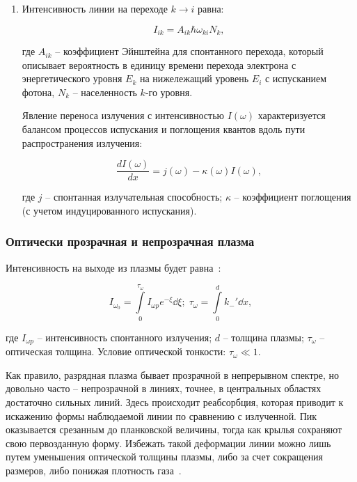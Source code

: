 \documentclass[10pt, a4paper]{article}
\begin{document}
\begin{enumerate}
	\item Интенсивность линии на переходе
$k\rightarrow i$ равна:

	\begin{equation*}
		I_{ik} = A_{ik}\hbar\omega_{ki}N_k,
	\end{equation*}	
	
	где $A_{ik}$ -- коэффициент Эйнштейна для спонтанного перехода,
	который описывает вероятность в единицу времени перехода
	электрона с энергетического уровня $E_k$ на нижележащий 
	уровень $E_i$ с испусканием фотона, $N_k$ -- населенность $k$-го уровня.
		
	Явление переноса излучения с интенсивностью $I(\omega)$ характеризуется балансом процессов испускания и поглощения
	квантов вдоль пути распространения излучения:
	
	\begin{equation}
		\frac{dI(\omega)}{dx}=j(\omega)-\kappa(\omega)I(\omega),
	\end{equation}

	где $j$ -- спонтанная излучательная способность; $\kappa$ -- коэффициент поглощения (с учетом индуцированного испускания).
	
\end{enumerate}

\subsubsection{Оптически прозрачная и непрозрачная плазма} \label{subsubsec:optical_depth}

Интенсивность на выходе из плазмы будет равна~\cite{raizer}:

\begin{equation*}
	I_{\omega_0} = \int\limits_0^{\tau_\omega} I_{\omega p}e^{-\xi}\dd{\xi}; \; \tau_\omega = \int\limits_0^dk_{-}'\dd{x},
\end{equation*}

где $I_{\omega p}$ -- интенсивность спонтанного излучения; $d$ -- толщина плазмы; $\tau_\omega$ -- оптическая толщина. Условие оптической тонкости: $\tau_\omega\ll1$.

Как правило, разрядная плазма бывает прозрачной в непрерывном спектре, но довольно часто -- непрозрачной в линиях, точнее, в центральных областях достаточно сильных линий. Здесь происходит реабсорбция, которая приводит к искажению формы наблюдаемой линии по сравнению с излученной. Пик оказывается срезанным до планковской величины, тогда как крылья сохраняют свою первозданную форму. Избежать такой деформации линии можно лишь путем уменьшения оптической толщины плазмы, либо за счет сокращения размеров, либо понижая плотность газа~\cite{raizer}.	
\end{document}
